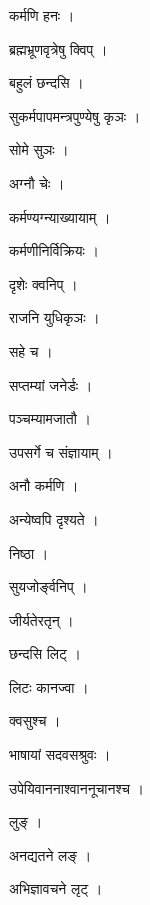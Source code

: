 \documentclass[10pt, openany]{book}
\begin{document}
\noindent कर्मणि हनः ।

\noindent ब्रह्मभ्रूणवृत्रेषु क्विप् ।

\noindent बहुलं छन्दसि ।

\noindent सुकर्मपापमन्त्रपुण्येषु कृञः ।

\noindent सोमे सुञः ।

\noindent अग्नौ चेः ।

\noindent कर्मण्यग्न्याख्यायाम् ।

\noindent कर्मणीनिर्विक्रियः ।

\noindent दृशेः क्वनिप् ।

\noindent राजनि युधिकृञः ।

\noindent सहे च ।

\noindent सप्तम्यां जनेर्डः ।

\noindent पञ्चम्यामजातौ ।

\noindent उपसर्गे च संज्ञायाम् ।

\noindent अनौ कर्मणि ।

\noindent अन्येष्वपि दृश्यते ।

\noindent निष्ठा ।

\noindent सुयजोर्ङ्वनिप् ।

\noindent जीर्यतेरतृन् ।

\noindent छन्दसि लिट् ।

\noindent लिटः कानज्वा ।

\noindent क्वसुश्च ।

\noindent भाषायां सदवसश्रुवः ।

\noindent उपेयिवाननाश्वाननूचानश्च ।

\noindent लुङ् ।

\noindent अनद्यतने लङ् ।

\noindent अभिज्ञावचने लृट् ।
\end{document}
